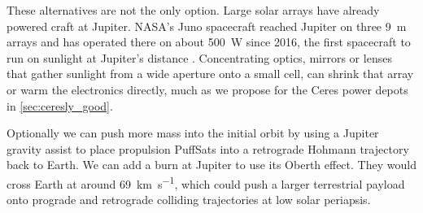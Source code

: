 \documentclass{article}
\begin{document}
These alternatives are not the only option. Large solar arrays have already powered craft at Jupiter. NASA's Juno spacecraft reached Jupiter on three \SI{9}{\meter} arrays and has operated there on about \SI{500}{\watt} since 2016, the first spacecraft to run on sunlight at Jupiter's distance \cite{bolton2017juno, juno_solar_record}. Concentrating optics, mirrors or lenses that gather sunlight from a wide aperture onto a small cell, can shrink that array or warm the electronics directly, much as we propose for the Ceres power depots in \autoref{sec:ceresly_good}.

Optionally we can push more mass into the initial orbit by using a Jupiter gravity assist to place propulsion PuffSats into a retrograde Hohmann trajectory back to Earth. We can add a burn at Jupiter to use its Oberth effect.   They would cross Earth at around \SI{69}{\kilo\meter\per\second}, which could push a larger terrestrial payload onto  prograde and retrograde colliding trajectories at low solar periapsis.
\end{document}
